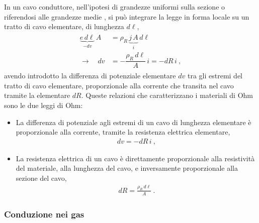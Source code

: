 \documentclass[letterpaper,10pt,italian]{jupyterBook}
\begin{document}
\sphinxAtStartPar
In un cavo conduttore, nell’ipotesi di grandezze uniformi sulla sezione \sphinxhyphen{} o riferendosi alle grandezze medie \sphinxhyphen{}, si può integrare la legge in forma locale su un tratto di cavo elementare, di lunghezza \(d \ell\),
\begin{equation*}
\begin{split}\begin{aligned}
 \underbrace{e \, d \ell}_{- d v} \, A & = \rho_R \, \underbrace{j \, A}_{i} \, d \ell \\
 \rightarrow \quad dv & = - \dfrac{\rho_R \, d \ell}{A} \, i = - dR \, i \ , 
\end{aligned}\end{split}
\end{equation*}
\sphinxAtStartPar
avendo introdotto la differenza di potenziale elementare \(d v\) tra gli estremi del tratto di cavo elementare, proporzionale alla corrente che transita nel cavo tramite la  elementare \(dR\). Queste relazioni che caratterizzano i materiali di Ohm sono le due leggi di Ohm:
\begin{itemize}
\item {} 
\sphinxAtStartPar
{} La differenza di potenziale agli estremi di un cavo di lunghezza elementare è proporzionale alla corrente, tramite la resistenza elettrica elementare,
\begin{equation*}
\begin{split}dv = - dR \, i \ ,\end{split}
\end{equation*}
\item {} 
\sphinxAtStartPar
{} La resistenza elettrica di un cavo è direttamente proporzionale alla resistività del materiale, alla lunghezza del cavo, e inversamente proporzionale alla sezione del cavo,
\begin{equation*}
\begin{split}dR = \frac{\rho_R \, d\ell}{A} \ .\end{split}
\end{equation*}
\end{itemize}


\subsubsection{Conduzione nei gas}
\label{\detokenize{ch/electromagnetism/electric-current:conduzione-nei-gas}}
\end{document}
